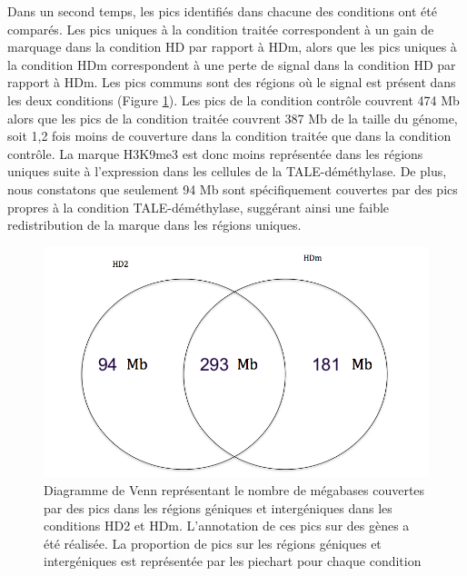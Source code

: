 \documentclass[a4paper,12pt,times]{report}
\newcommand{\scaption}[1]{\caption{\footnotesize{#1}}}
\begin{document}
   Dans un second temps, les pics identifiés dans chacune des conditions ont été comparés.
   Les pics uniques à la condition traitée correspondent à un gain de marquage dans la condition HD par rapport à HDm, alors que les pics uniques à la condition HDm correspondent à une perte de signal dans la condition HD par rapport à HDm.
   Les pics communs sont des régions où le signal est présent dans les deux conditions  (Figure \ref{Venny}).
    \newline
    Les pics de la condition contrôle couvrent 474 Mb alors que les pics de la condition traitée couvrent 387 Mb de la taille du génome, soit 1,2 fois moins de couverture dans la condition traitée que dans la condition contrôle. La marque H3K9me3 est donc moins représentée dans les régions uniques suite à l'expression dans les cellules de la TALE-déméthylase.
De plus, nous constatons que seulement 94 Mb sont spécifiquement couvertes par des pics propres à la condition TALE-déméthylase, suggérant ainsi une faible redistribution de la marque dans les régions uniques.

\begin{figure}[!h]
\centering
\includegraphics[scale=0.3]{Venny.png}
\scaption{Diagramme de Venn représentant le nombre de mégabases couvertes par des pics dans les régions géniques et intergéniques dans les conditions HD2 et HDm. L'annotation de ces pics sur des gènes a été réalisée. La proportion de pics sur les régions géniques et intergéniques est représentée par les piechart pour chaque condition}
\label{Venny}
\end{figure}
\end{document}

